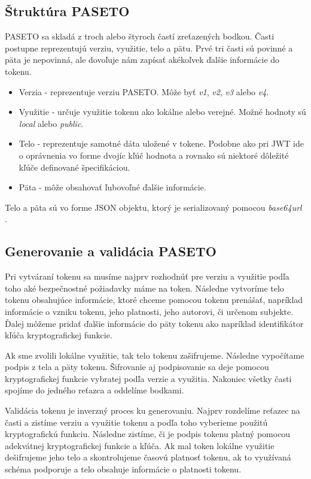 \subsection{Štruktúra PASETO}

PASETO sa skladá z troch alebo štyroch častí zreťazených bodkou. Časti postupne reprezentujú verziu, využitie, telo a pätu. Prvé tri časti sú povinné a päta je nepovinná, ale dovoľuje nám zapísať akékoľvek ďalšie informácie do tokenu.

\begin{itemize}
    \item Verzia - reprezentuje verziu PASETO. Môže byť \textit{v1}, \textit{v2}, \textit{v3} alebo \textit{v4}.
    \item Využitie - určuje využitie tokenu ako lokálne alebo verejné. Možné hodnoty sú \textit{local} alebo \textit{public}.
    \item Telo - reprezentuje samotné dáta uložené v tokene. Podobne ako pri JWT ide o oprávnenia vo forme dvojíc kľúč hodnota a rovnako sú niektoré dôležité kľúče definované špecifikáciou. \cite{paseto_git}
    \item Päta - môže obsahovať ľubovoľné ďalšie informácie.
\end{itemize}

Telo a päta sú vo forme JSON objektu, ktorý je serializovaný pomocou \textit{base64url} \cite{base64_rfc}.


\subsection{Generovanie a validácia PASETO}

Pri vytváraní tokenu sa musíme najprv rozhodnúť pre verziu a využitie podľa toho aké bezpečnostné požiadavky máme na token. Následne vytvoríme telo tokenu obsahujúce informácie, ktoré chceme pomocou tokenu prenášať, napríklad informácie o vzniku tokenu, jeho platnosti, jeho autorovi, či určenom subjekte. Ďalej môžeme pridať ďalšie informácie do päty tokenu ako napríklad identifikátor kľúča kryptografickej funkcie. 

Ak sme zvolili lokálne využitie, tak telo tokenu zašifrujeme. Následne vypočítame podpis z tela a päty tokenu. Šifrovanie aj podpisovanie sa deje pomocou kryptografickej funkcie vybratej podľa verzie a využitia. Nakoniec všetky časti spojíme do jedného reťazca a oddelíme bodkami.

Validácia tokenu je inverzný proces ku generovaniu. Najprv rozdelíme reťazec na časti a zistíme verziu a využitie tokenu a podľa toho vyberieme použitú kryptografickú funkciu. Následne zistíme, či je podpis tokenu platný pomocou adekvátnej kryptografickej funkcie a kľúča. Ak mal token lokálne využitie dešifrujeme jeho telo a skontrolujeme časovú platnosť tokenu, ak to využívaná schéma podporuje a telo obsahuje informácie o platnosti tokenu.

